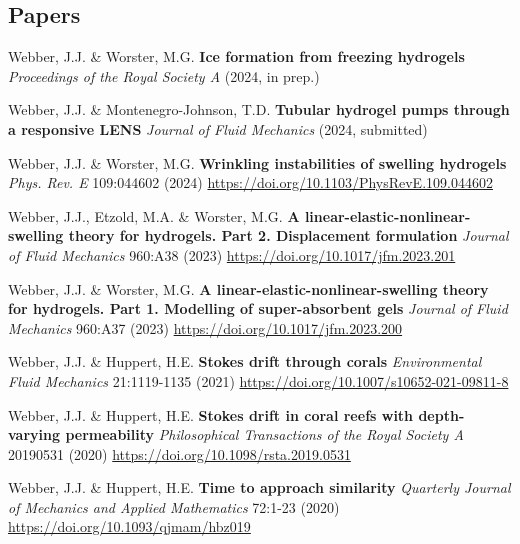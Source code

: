 \documentclass[a4paper]{article}
\begin{document}
    \begin{multicols}{2}
        \subsection*{Papers}
            \begin{small}
                \begin{itemize}
                    {\color{gray}\item Webber, J.J. \& Worster, M.G. \textbf{Ice formation from freezing hydrogels} \textit{Proceedings of the Royal Society A} (2024, in prep.)}
                    {\color{gray}\item Webber, J.J. \& Montenegro-Johnson, T.D. \textbf{Tubular hydrogel pumps through a responsive LENS} \textit{Journal of Fluid Mechanics} (2024, submitted)}
                    \item Webber, J.J. \& Worster, M.G. \textbf{Wrinkling instabilities of swelling hydrogels} \emph{Phys. Rev. E} 109:044602 (2024) \href{https://doi.org/10.1103/PhysRevE.109.044602}{https://doi.org/10.1103/PhysRevE.109.044602}
                    \item Webber, J.J., Etzold, M.A. \& Worster, M.G. \textbf{A linear-elastic-nonlinear-swelling theory for hydrogels. Part 2. Displacement formulation} \emph{Journal of Fluid Mechanics} 960:A38 (2023) \href{https://doi.org/10.1017/jfm.2023.201}{https://doi.org/10.1017/jfm.2023.201}
                    \item Webber, J.J. \& Worster, M.G. \textbf{A linear-elastic-nonlinear-swelling theory for hydrogels. Part 1. Modelling of super-absorbent gels} \emph{Journal of Fluid Mechanics} 960:A37 (2023) \href{https://doi.org/10.1017/jfm.2023.200}{https://doi.org/10.1017/jfm.2023.200}
                    \item Webber, J.J. \& Huppert, H.E. \textbf{Stokes drift through corals} \emph{Environmental Fluid Mechanics} 21:1119-1135 (2021) \href{https://doi.org/10.1007/s10652-021-09811-8}{https://doi.org/10.1007/s10652-021-09811-8}
                    \item Webber, J.J. \& Huppert, H.E. \textbf{Stokes drift in coral reefs with depth-varying permeability} \emph{Philosophical Transactions of the Royal Society A} 20190531 (2020) \href{https://doi.org/10.1098/rsta.2019.0531}{https://doi.org/10.1098/rsta.2019.0531}
                    \columnbreak
                    \item Webber, J.J. \& Huppert, H.E. \textbf{Time to approach similarity} \emph{Quarterly Journal of Mechanics and Applied Mathematics} 72:1-23 (2020) \href{https://doi.org/10.1093/qjmam/hbz019}{https://doi.org/10.1093/qjmam/hbz019}
                \end{itemize}
            \end{small}

\end{multicols}
\end{document}
